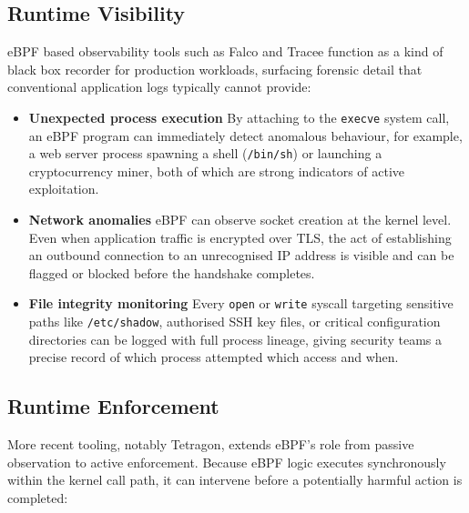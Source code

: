 \subsection{Runtime Visibility}
 
eBPF based observability tools such as Falco and Tracee function as a kind of black box recorder for production workloads, surfacing forensic detail that conventional application logs typically cannot provide:
 
\begin{itemize}[leftmargin=1.5em]
    \item \textbf{Unexpected process execution} By attaching to the \texttt{execve} system call, an eBPF program can immediately detect anomalous behaviour, for example, a web server process spawning a shell (\texttt{/bin/sh}) or launching a cryptocurrency miner, both of which are strong indicators of active exploitation.
 
    \item \textbf{Network anomalies} eBPF can observe socket creation at the kernel level. Even when application traffic is encrypted over TLS, the act of establishing an outbound connection to an unrecognised IP address is visible and can be flagged or blocked before the handshake completes.
 
    \item \textbf{File integrity monitoring} Every \texttt{open} or \texttt{write} syscall targeting sensitive paths like \texttt{/etc/shadow}, authorised SSH key files, or critical configuration directories can be logged with full process lineage, giving security teams a precise record of which process attempted which access and when.
\end{itemize}
 
\subsection{Runtime Enforcement}
 
More recent tooling, notably Tetragon, extends eBPF's role from passive observation to active enforcement. Because eBPF logic executes synchronously within the kernel call path, it can intervene before a potentially harmful action is completed:
 
